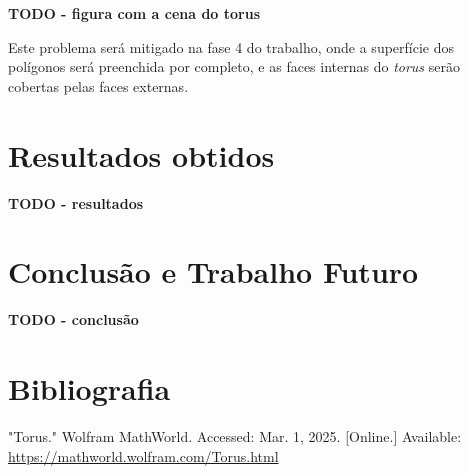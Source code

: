 \documentclass[12pt, a4paper]{article}
\begin{document}
\textbf{\color{red} TODO - figura com a cena do torus}

Este problema será mitigado na fase 4 do trabalho, onde a superfície dos polígonos será preenchida
por completo, e as faces internas do \emph{torus} serão cobertas pelas faces externas.

\section{Resultados obtidos}

\textbf{\color{red} TODO - resultados}

\section{Conclusão e Trabalho Futuro}

\textbf{\color{red} TODO - conclusão}

\begingroup
\section{Bibliografia}
\renewcommand{\section}[2]{}

\begin{thebibliography}{9}
        "Torus."{} Wolfram MathWorld. Accessed: Mar. 1, 2025. [Online.] Available:
        \url{https://mathworld.wolfram.com/Torus.html}
\end{thebibliography}
\endgroup
\end{document}
